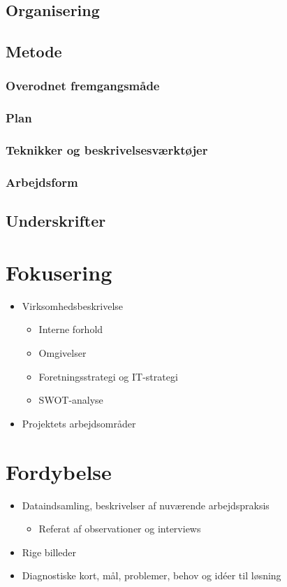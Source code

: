 \documentclass[12pt, a4paper]{report}
\begin{document}
\subsection{Organisering}

\subsection{Metode}
\subsubsection{Overodnet fremgangsmåde}
\subsubsection{Plan}
\subsubsection{Teknikker og beskrivelsesværktøjer}
\subsubsection{Arbejdsform}

\subsection{Underskrifter}

\section*{Fokusering}
 \begin{itemize}
   \item Virksomhedsbeskrivelse

\begin{itemize}

   \item Interne forhold

   \item Omgivelser

   \item Foretningsstrategi og IT-strategi

   \item SWOT-analyse

\end{itemize}
   \item Projektets arbejdsområder
 \end{itemize}

\section*{Fordybelse}
\begin{itemize}
\item Dataindsamling, beskrivelser af nuværende arbejdspraksis
\begin{itemize}
\item Referat af observationer og interviews
\end{itemize}
\item Rige billeder
\item Diagnostiske kort, mål, problemer, behov og idéer til løsning
\end{itemize}
\end{document}
